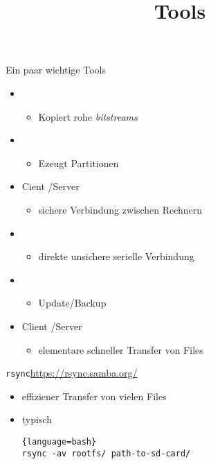 \documentclass{beamer}
\begin{document}
\newcommand{\md}{\cod{md-bbb-{\em version}.img}}
\newcommand{\mdev}{\cod{md-bbb-devel-{\em version}.tar.gz}}

\title{Tools}

\frame{\titlepage}

\begin{frame}{Ein paar wichtige Tools}
 \begin{itemize}
  \item {}
  \begin{itemize}
   \item Kopiert rohe {\em bitstreams}
  \end{itemize}
  \item {}
  \begin{itemize}
   \item Ezeugt Partitionen
  \end{itemize}
  \item Cient /Server 
  \begin{itemize}
   \item sichere Verbindung zwischen Rechnern
  \end{itemize}
  \item {}
  \begin{itemize}
   \item direkte unsichere serielle Verbindung 
  \end{itemize}
  \item {}
  \begin{itemize}
   \item Update/Backup 
  \end{itemize}
  \item Client /Server 
  \begin{itemize}
   \item elementare schneller Transfer von Files
  \end{itemize}
 \end{itemize}
\end{frame}

\begin{frame}[fragile]{{\tt rsync}}{\url{https://rsync.samba.org/}}
 \begin{itemize}
  \item effiziener Transfer von vielen Files
  \item typisch
\begin{lstlisting}{language=bash}
rsync -av rootfs/ path-to-sd-card/
\end{lstlisting}
 \end{itemize}
\end{frame}
\end{document}
